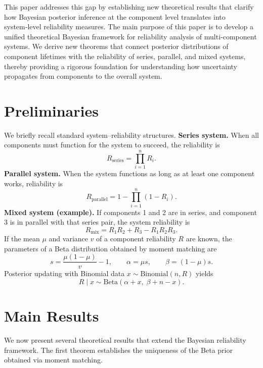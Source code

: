 \documentclass[twoside]{article}
\theoremstyle{plain}
\theoremstyle{definition}
\begin{document}
This paper addresses this gap by establishing new theoretical results that clarify how Bayesian posterior inference at the component level translates into system‑level reliability measures.
The main purpose of this paper is to develop a unified theoretical Bayesian framework for reliability analysis of multi‑component systems. We derive new theorems that connect posterior distributions of component lifetimes with the reliability of series, parallel, and mixed systems, thereby providing a rigorous foundation for understanding how uncertainty propagates from components to the overall system.
\section{Preliminaries}
We briefly recall standard system--reliability structures.
\noindent
\textbf{Series system.}
When all components must function for the system to succeed, the reliability is
\begin{equation}
R_{\text{series}} = \prod_{i=1}^{n} R_i .
\end{equation}
\noindent
\textbf{Parallel system.}
When the system functions as long as at least one component works, reliability is
\begin{equation}
R_{\text{parallel}} = 1 - \prod_{i=1}^{n} (1 - R_i).
\end{equation}
\noindent
\textbf{Mixed system (example).}
If components 1 and 2 are in series, and component 3 is in parallel with that series pair, the system reliability is
\begin{equation}
R_{\text{mix}} = R_1 R_2 + R_3 - R_1 R_2 R_3 .
\end{equation}
\medskip
If the mean $\mu$ and variance $v$ of a component reliability $R$ are known, the parameters of a Beta distribution obtained by moment matching are
$$
s = \frac{\mu(1-\mu)}{v} - 1, \qquad 
\alpha = \mu s, \qquad 
\beta = (1-\mu)s .
$$
Posterior updating with Binomial data $x \sim \text{Binomial}(n,R)$ yields
\begin{equation}
R \mid x \sim \text{Beta}(\alpha + x,\; \beta + n - x).
\end{equation}

\section{Main Results}

We now present several theoretical results that extend the Bayesian reliability framework. 
The first theorem establishes the uniqueness of the Beta prior obtained via moment matching.
\end{document}
